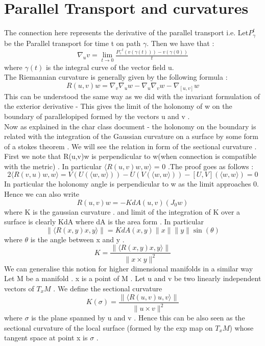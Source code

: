 \documentclass[psamsfonts]{amsart}
\theoremstyle{definition}
\theoremstyle{remark}
\numberwithin{equation}{section}
\begin{document}
 \section{Parallel Transport and curvatures}
 The connection here represents the derivative of the parallel transport
 i.e. Let$ P^{t}_{\gamma}$ be the Parallel transport for time t on path $\gamma$. Then we have that :
 \[\nabla_{u}v  = \lim_{t \to 0}\tfrac{P^{-t}_{\gamma}(v(\gamma(t))) -v(\gamma(0))}{t} \] 
 where $\gamma(t)$ is the integral curve of the vector field u. \\
 The Riemannian curvature is generally given by the following formula :
\[       R(u,v)w = \nabla_{v}\nabla_{u}w - \nabla_{u}\nabla_{v}w -\nabla_{[u,v]}w                           \] 
This can be understood the same way as we did with the invariant formulation of the exterior derivative - This gives the limit of the holonomy of w on the boundary of parallelopiped formed by the vectors u and v . \\
Now as explained in the char class document - the holonomy on the boundary is related with the integration of the Gaussian curvature on a surface by some form of a stokes theorem . We will see the relation in form of the sectional curvature . \\
First we note that R(u,v)w  is perpendicular to w(when connection is compatible with the metric) . In particular $\langle R(u,v)w , w \rangle$ = 0 .The proof goes as follows :
\[       2 \langle R(v,u)w , w \rangle = V(U(\langle w , w \rangle )) - U(V(\langle w , w \rangle )) - [U,V](\langle w , w \rangle )  = 0       \] 
In particular the holonomy angle is perpendicular to w as the limit approaches 0. Hence we can also write
\[     R(u,v)w = -KdA(u,v) (J_{0}w)                   \]
where K is the gaussian curvature . and limit of the integration of K over a surface is clearly KdA where dA is the area form .
In particular
\[ \|\langle R(x,y)x,y \rangle\| = KdA(x,y)\|x\|\|y\|\sin(\theta)  \]
where $\theta$ is the angle between x and y .
\[ K = \dfrac{\|\langle R(x,y)x,y \rangle\|}{\|x \times y \|^{2}}\]
We can generalise this notion for higher dimensional manifolds in a
 similar way \\
 Let M be a manifold . x is a point of M . Let u and v be two linearly independent vectors of $T_{x}M$ . We define the sectional curvature 
 \[  K(\sigma) = \dfrac{\|\langle R(u,v)u,v \rangle\|}{\|u \times v \|^{2}}                                              \] 
where $\sigma$ is the plane spanned by u and v . Hence this can be also seen as the sectional curvature of the local surface (formed by the exp map on $T_{x}M$) whose tangent space at point x is $\sigma$ . \\
\end{document}
